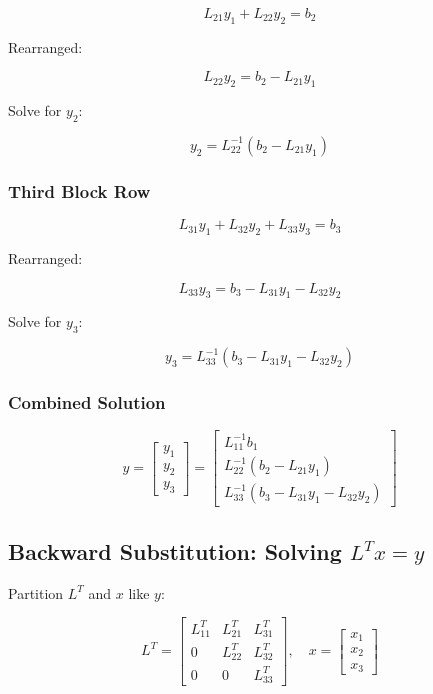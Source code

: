 \documentclass[
  letterpaper,
  DIV=11,
  numbers=noendperiod]{scrartcl}
\begin{document}
\[
L_{21}y_1 + L_{22}y_2 = b_2
\]

Rearranged:

\[
L_{22}y_2 = b_2 - L_{21}y_1
\]

Solve for \(y_2\):

\[
y_2 = L_{22}^{-1}\left(b_2 - L_{21}y_1\right)
\]

\subsubsection{\texorpdfstring{\textbf{Third Block
Row}}{Third Block Row}}\label{third-block-row}

\[
L_{31}y_1 + L_{32}y_2 + L_{33}y_3 = b_3
\]

Rearranged:

\[
L_{33}y_3 = b_3 - L_{31}y_1 - L_{32}y_2
\]

Solve for \(y_3\):

\[
y_3 = L_{33}^{-1}\left(b_3 - L_{31}y_1 - L_{32}y_2\right)
\]

\subsubsection{\texorpdfstring{\textbf{Combined
Solution}}{Combined Solution}}\label{combined-solution}

\[
y = \begin{bmatrix}
y_1 \\
y_2 \\
y_3
\end{bmatrix} =
\begin{bmatrix}
 L_{11}^{-1}b_1 \\
L_{22}^{-1}\left(b_2 - L_{21}y_1\right) \\
L_{33}^{-1}\left(b_3 - L_{31}y_1 - L_{32}y_2\right)
\end{bmatrix}
\]

\subsection{\texorpdfstring{Backward Substitution: Solving
\(L^Tx = y\)}{Backward Substitution: Solving L\^{}Tx = y}}\label{backward-substitution-solving-ltx-y}

Partition \(L^T\) and \(x\) like \(y\):

\[
L^T = \begin{bmatrix}
L_{11}^T & L_{21}^T & L_{31}^T \\
0 & L_{22}^T & L_{32}^T \\
0 & 0 & L_{33}^T
\end{bmatrix}, \quad
x = \begin{bmatrix}
x_1 \\
x_2 \\
x_3
\end{bmatrix}
\]
\end{document}
